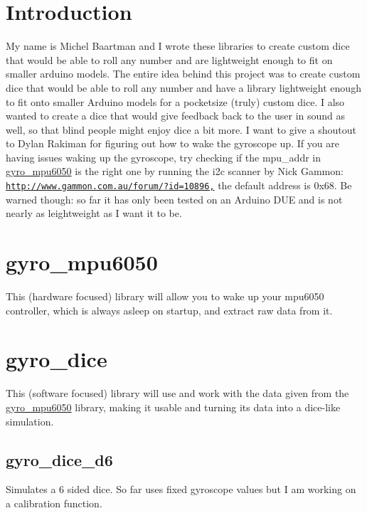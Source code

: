 \hypertarget{index_Introduction}{}\section{Introduction}\label{index_Introduction}
My name is Michel Baartman and I wrote these libraries to create custom dice that would be able to roll any number and are lightweight enough to fit on smaller arduino models. The entire idea behind this project was to create custom dice that would be able to roll any number and have a library lightweight enough to fit onto smaller Arduino models for a pocketsize (truly) custom dice. I also wanted to create a dice that would give feedback back to the user in sound as well, so that blind people might enjoy dice a bit more. I want to give a shoutout to Dylan Rakiman for figuring out how to wake the gyroscope up. If you are having issues waking up the gyroscope, try checking if the mpu\+\_\+addr in \hyperlink{classgyro__mpu6050}{gyro\+\_\+mpu6050} is the right one by running the i2c scanner by Nick Gammon\+: \href{http://www.gammon.com.au/forum/?id=10896,}{\tt http\+://www.\+gammon.\+com.\+au/forum/?id=10896,} the default address is 0x68. Be warned though\+: so far it has only been tested on an Arduino D\+UE and is not nearly as leightweight as I want it to be.\hypertarget{index_gyro_mpu6050}{}\section{gyro\+\_\+mpu6050}\label{index_gyro_mpu6050}
This (hardware focused) library will allow you to wake up your mpu6050 controller, which is always asleep on startup, and extract raw data from it.\hypertarget{index_gyro_dice}{}\section{gyro\+\_\+dice}\label{index_gyro_dice}
This (software focused) library will use and work with the data given from the \hyperlink{classgyro__mpu6050}{gyro\+\_\+mpu6050} library, making it usable and turning its data into a dice-\/like simulation. \hypertarget{index_gyro_dice_d6}{}\subsection{gyro\+\_\+dice\+\_\+d6}\label{index_gyro_dice_d6}
Simulates a 6 sided dice. So far uses fixed gyroscope values but I am working on a calibration function. \hypertarget{_}{}\subsection{}\label{_}
